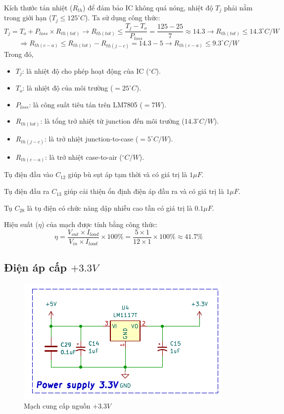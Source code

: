 Kích thước tản nhiệt ($R_{th}$) để đảm bảo IC không quá nóng, nhiệt độ $T_j$ phải nằm trong giới hạn ($T_j \leq 125^{\circ}C$). Ta sử dụng công thức: \[ T_{j} = T_{o} + P_{loss} \times R_{th(tot)} \rightarrow R_{th(tot)} \leq \dfrac{T_{j} - T_{o}}{P_{loss}} = \dfrac{125 - 25}{7} \approx 14.3 \rightarrow R_{th(tot)} \leq 14.3^{\circ}C/W
\]
\[ \Rightarrow R_{th(c-a)} \leq R_{th(tot)} - R_{th(j-c)} = 14.3 - 5 \rightarrow R_{th(c-a)} \leq 9.3^{\circ}C/W \]
Trong đó,
\begin{itemize}[label = -]
	\item $T_{j}$: là nhiệt độ cho phép hoạt động của IC ($ ^\circ C$).
	\item $T_{o}$: là nhiệt độ của môi trường ($=25^{\circ}C$).
	\item $P_{loss}$: là công suất tiêu tán trên LM7805 ($=7W$).
	\item $R_{th(tot)}$: là tổng trở nhiệt từ junction đến môi trường ($14.3^{\circ}C/W$).
	\item $R_{th(j-c)}$: là trở nhiệt junction-to-case ($=5^{\circ}C/W$).
	\item $R_{th(c-a)}$: là trở nhiệt case-to-air ($^{\circ}C/W$).
\end{itemize}

Tụ điện đầu vào $C_{12}$ giúp bù sụt áp tạm thời và có giá trị là $1\mu F$.

Tụ điện đầu ra $C_{13}$ giúp cải thiện ổn định điện áp đầu ra và có giá trị là $1\mu F$.

Tụ $C_{28}$ là tụ điện có chức năng dập nhiễu cao tần có giá trị là $0.1\mu F$.

Hiệu suất ($\eta$) của mạch được tính bằng công thức: \[ \eta = \dfrac{V_{out}\times I_{load}}{V_{in} \times I_{load}}\times 100\% = \dfrac{5\times 1}{12 \times 1}\times 100\% \approx 41.7\% \]

\subsection{Điện áp cấp $+3.3V$}

\begin{figure}[H]
	\centering
	\includegraphics[width=0.6\linewidth]{./picture/power_supply_3V.pdf}
	\caption{Mạch cung cấp nguồn $+3.3V$}
	\label{f_supply_+3.3V}
\end{figure}

